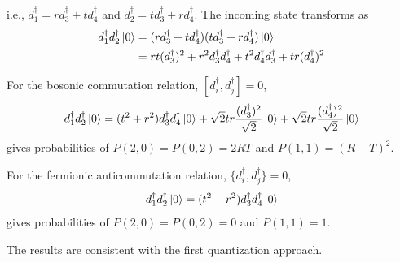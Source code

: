 \documentclass[a4paper,11pt]{article}
\begin{document}
i.e., $d_1^\dagger = r d_3^\dagger + t d_4^\dagger$ and $d_2^\dagger = t d_3^\dagger + r d_4^\dagger$.
The incoming state transforms as
\begin{align}
    d_1^\dagger d_2^\dagger \ket{0}
    &= (rd_3^\dagger + td_4^\dagger)(td_3^\dagger + rd_4^\dagger)\ket{0} \\
    &= rt (d_3^\dagger)^2 + r^2 d_3^\dagger d_4^\dagger + t^2 d_4^\dagger d_3^\dagger + tr (d_4^\dagger)^2
\end{align}


For the bosonic commutation relation, $[d_i^\dagger, d_j^\dagger] = 0$,
\begin{align}
    d_1^\dagger d_2^\dagger\ket{0} = (t^2 + r^2) d_3^\dagger d_4^\dagger\ket{0} + \sqrt{2}tr \frac{(d_3^\dagger)^2}{\sqrt2}\ket{0} + \sqrt{2}tr \frac{(d_4^\dagger)^2}{\sqrt2}\ket{0}    
\end{align}
gives probabilities of $P(2, 0) = P(0, 2) = 2RT$ and $P(1, 1) = (R - T)^2$.

For the fermionic anticommutation relation, $\{d_i^\dagger, d_j^\dagger\} = 0$,
\begin{align}
    d_1^\dagger d_2^\dagger\ket{0} = (t^2 - r^2) d_3^\dagger d_4^\dagger\ket{0}
\end{align}
gives probabilities of $P(2, 0) = P(0, 2) = 0$ and $P(1, 1) = 1$.

The results are consistent with the first quantization approach.
\end{document}
